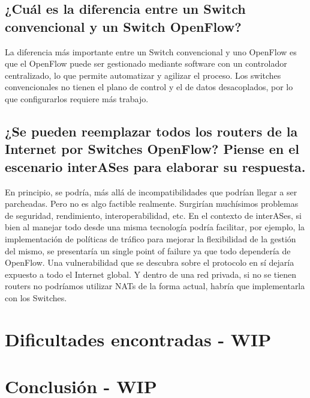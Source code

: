 \documentclass{article}
\begin{document}
\subsection{¿Cuál es la diferencia entre un Switch convencional y un Switch OpenFlow?}

La diferencia más importante entre un Switch convencional y uno OpenFlow es que el OpenFlow puede ser gestionado mediante software con un controlador centralizado, lo que permite automatizar y agilizar el proceso. Los switches convencionales no tienen el plano de control y el de datos desacoplados, por lo que configurarlos requiere más trabajo.

\subsection{¿Se pueden reemplazar todos los routers de la Internet por Switches OpenFlow? Piense en el escenario interASes para elaborar su respuesta.}

En principio, se podría, más allá de incompatibilidades que podrían llegar a ser parcheadas. Pero no es algo factible realmente. Surgirían muchísimos problemas de seguridad, rendimiento, interoperabilidad, etc. En el contexto de interASes, si bien al manejar todo desde una misma tecnología podría facilitar, por ejemplo, la implementación de políticas de tráfico para mejorar la flexibilidad de la gestión del mismo, se presentaría un single point of failure ya que todo dependería de OpenFlow. Una vulnerabilidad que se descubra sobre el protocolo en sí dejaría expuesto a todo el Internet global. Y dentro de una red privada, si no se tienen routers no podríamos utilizar NATs de la forma actual, habría que implementarla con los Switches. 

\section{Dificultades encontradas - WIP}\label{dificultades-encontradas}

\section{Conclusión - WIP}\label{conclusion-wip}
\end{document}
